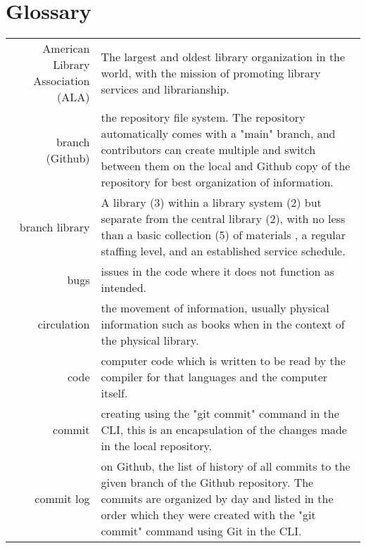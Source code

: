 \chapter*{Glossary} 

\begin{center}
\begin{longtable}{r p{}}

American Library Association (ALA) \cite{glossary2013} & The largest and oldest library organization in the world, with the mission of promoting library services and librarianship.  \\ 

branch (Github) & the repository file system. The repository automatically comes with a "main" branch, and contributors can create multiple and switch between them on the local and Github copy of the repository for best organization of information. \\ 

branch library \cite{glossary2013} & A library (3) within a library system (2) but separate from the central library (2), with no less than a basic collection (5) of materials , a regular staffing level, and an established service schedule. \\

bugs & issues in the code where it does not function as intended. \\ 

circulation & the movement of information, usually physical information such as books when in the context of the physical library.  \\

code & computer code which is written to be read by the compiler for that languages and the computer itself. \\

commit & creating using the "git commit" command \cite{gitdocs} in the CLI, this is an encapsulation of the changes made in the local repository. \\

commit log & on Github, the list of history of all commits to the given branch of the Github repository. The commits are organized by day and listed in the order which they were created with the "git commit" command using Git in the CLI. \\

\end{longtable}
\end{center} 

